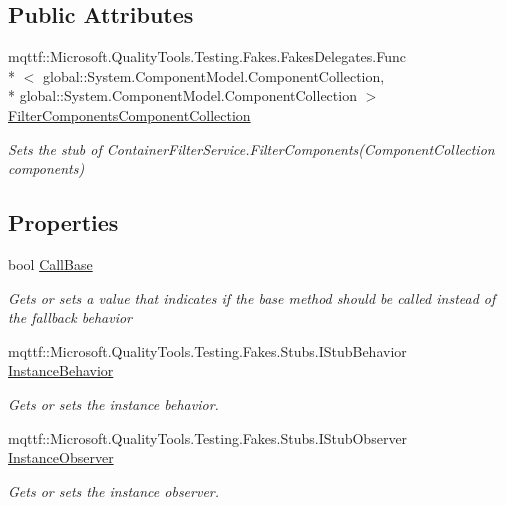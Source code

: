 \subsection*{Public Attributes}
\begin{DoxyCompactItemize}
\item 
mqttf\-::\-Microsoft.\-Quality\-Tools.\-Testing.\-Fakes.\-Fakes\-Delegates.\-Func\\*
$<$ global\-::\-System.\-Component\-Model.\-Component\-Collection, \\*
global\-::\-System.\-Component\-Model.\-Component\-Collection $>$ \hyperlink{class_system_1_1_component_model_1_1_fakes_1_1_stub_container_filter_service_a44b9176482e858720dc99b7e1117fcc4}{Filter\-Components\-Component\-Collection}
\begin{DoxyCompactList}\small\item\em Sets the stub of Container\-Filter\-Service.\-Filter\-Components(\-Component\-Collection components)\end{DoxyCompactList}\end{DoxyCompactItemize}
\subsection*{Properties}
\begin{DoxyCompactItemize}
\item 
bool \hyperlink{class_system_1_1_component_model_1_1_fakes_1_1_stub_container_filter_service_a26e65905c4e4fc9f4c5865840639ebc2}{Call\-Base}
\begin{DoxyCompactList}\small\item\em Gets or sets a value that indicates if the base method should be called instead of the fallback behavior\end{DoxyCompactList}\item 
mqttf\-::\-Microsoft.\-Quality\-Tools.\-Testing.\-Fakes.\-Stubs.\-I\-Stub\-Behavior \hyperlink{class_system_1_1_component_model_1_1_fakes_1_1_stub_container_filter_service_a88cf5ace85c03ac0f3db58ef436c4af8}{Instance\-Behavior}
\begin{DoxyCompactList}\small\item\em Gets or sets the instance behavior.\end{DoxyCompactList}\item 
mqttf\-::\-Microsoft.\-Quality\-Tools.\-Testing.\-Fakes.\-Stubs.\-I\-Stub\-Observer \hyperlink{class_system_1_1_component_model_1_1_fakes_1_1_stub_container_filter_service_a9878407a1af35f65f89661d9a40eda1a}{Instance\-Observer}
\begin{DoxyCompactList}\small\item\em Gets or sets the instance observer.\end{DoxyCompactList}\end{DoxyCompactItemize}


